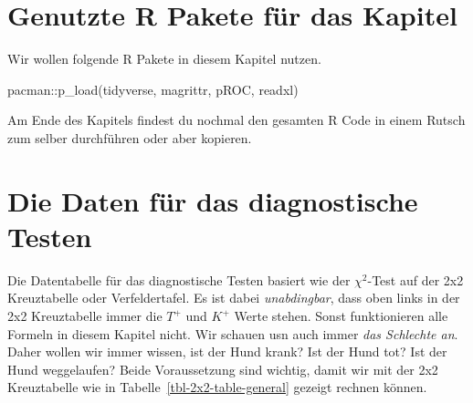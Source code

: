 \documentclass[
  letterpaper,
]{scrbook}
\newenvironment{Shaded}{\begin{snugshade}}{\end{snugshade}}
\newcommand{\FunctionTok}[1]{\textcolor[rgb]{0.28,0.35,0.67}{#1}}
\newcommand{\NormalTok}[1]{\textcolor[rgb]{0.00,0.23,0.31}{#1}}
\newcommand{\SpecialCharTok}[1]{\textcolor[rgb]{0.37,0.37,0.37}{#1}}
\begin{document}
\hypertarget{genutzte-r-pakete-fuxfcr-das-kapitel-12}{%
\section{Genutzte R Pakete für das
Kapitel}\label{genutzte-r-pakete-fuxfcr-das-kapitel-12}}

Wir wollen folgende R Pakete in diesem Kapitel nutzen.

\begin{Shaded}
\begin{Highlighting}[]
\NormalTok{pacman}\SpecialCharTok{::}\FunctionTok{p\_load}\NormalTok{(tidyverse, magrittr, }
\NormalTok{               pROC, readxl)}
\end{Highlighting}
\end{Shaded}

Am Ende des Kapitels findest du nochmal den gesamten R Code in einem
Rutsch zum selber durchführen oder aber kopieren.

\hypertarget{die-daten-fuxfcr-das-diagnostische-testen}{%
\section{Die Daten für das diagnostische
Testen}\label{die-daten-fuxfcr-das-diagnostische-testen}}

{}

Die Datentabelle für das diagnostische Testen basiert wie der
\(\chi^2\)-Test auf der 2x2 Kreuztabelle oder Verfeldertafel. Es ist
dabei \emph{unabdingbar}, dass oben links in der 2x2 Kreuztabelle immer
die \(T^+\) und \(K^+\) Werte stehen. Sonst funktionieren alle Formeln
in diesem Kapitel nicht. Wir schauen usn auch immer \emph{das Schlechte
an}. Daher wollen wir immer wissen, ist der Hund krank? Ist der Hund
tot? Ist der Hund weggelaufen? Beide Voraussetzung sind wichtig, damit
wir mit der 2x2 Kreuztabelle wie in Tabelle~\ref{tbl-2x2-table-general}
gezeigt rechnen können.
\end{document}
